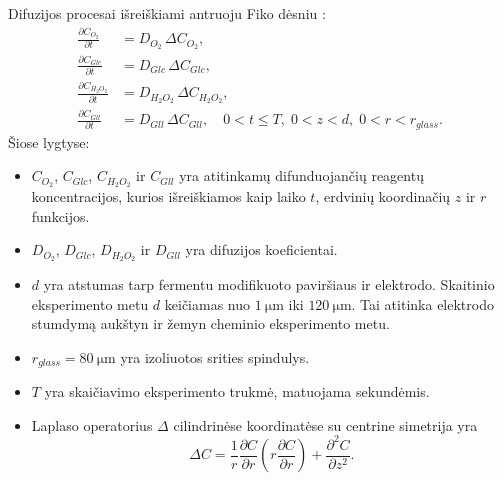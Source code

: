 Difuzijos procesai išreiškiami antruoju Fiko dėsniu \cite{laforge2008physicochemical}:
\begin{equation}
  \begin{aligned}\label{eq:santr_eq1}
  \frac{\partial C_{O_2}}{\partial t} &= D_{O_2}\,\Delta C_{O_2},\\
  \frac{\partial C_{Glc}}{\partial t} &= D_{Glc}\,\Delta C_{Glc},\\
  \frac{\partial C_{H_2 O_2}}{\partial t} &= D_{H_2 O_2} \,\Delta C_{H_2 O_2},\\
  \frac{\partial C_{Gll}}{\partial t} &= D_{Gll}\,\Delta C_{Gll},  \quad 0<t\leq T,\; 0<z<d,\; 0<r<r_{glass}.
  \end{aligned}
\end{equation}
Šiose lygtyse:
\begin{itemize}
  \item[] $C_{O_2}$, $C_{Glc}$, $C_{H_2 O_2}$ ir $C_{Gll}$ yra atitinkamų difunduojančių re\-a\-gen\-tų koncentracijos, kurios išreiškiamos kaip laiko $t$, er\-dvi\-nių ko\-or\-di\-na\-čių $z$ ir $r$ funkcijos. 
  \item[] $D_{O_2}$, $D_{Glc}$, $D_{H_2 O_2}$ ir $D_{Gll}$ yra difuzijos koeficientai.
  \item[] $d$ yra atstumas tarp fermentu modifikuoto paviršiaus ir elektrodo. Skaitinio eksperimento metu $d$ keičiamas nuo $\SI{1}{\um}$ iki $\SI{120}{\um}$. Tai atitinka elektrodo stumdymą aukštyn ir žemyn cheminio eksperimento metu.
  \item[] $r_{glass} = \SI{80}{\um}$ yra izoliuotos srities spindulys.
  \item[] $T$ yra skaičiavimo eksperimento trukmė, matuojama sekundėmis.
  \item[] Laplaso operatorius $\Delta$ cilindrinėse koordinatėse su centrine simetrija yra
  \begin{equation*}
  \Delta C = \frac{1}{r}\frac{\partial C }{\partial r} \left( r\frac{\partial C }{\partial r} \right) + \frac{\partial^{2} C}{\partial z^{2}}.
  \end{equation*}
\end{itemize}
